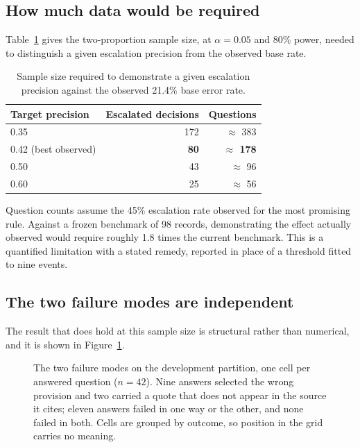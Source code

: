 \subsection{How much data would be required}

Table~\ref{tab:power} gives the two-proportion sample size, at
$\alpha = 0.05$ and 80\% power, needed to distinguish a given escalation
precision from the observed base rate.

\begin{table}[htbp]
  \centering
  \caption{Sample size required to demonstrate a given escalation precision against the observed 21.4\% base error rate.}
  \label{tab:power}
  \begin{tabular}{lrr}
    \toprule
    \textbf{Target precision} & \textbf{Escalated decisions} & \textbf{Questions} \\
    \midrule
    0.35 & 172 & $\approx$ 383 \\
    0.42 (best observed) & \textbf{80} & \textbf{$\approx$ 178} \\
    0.50 & 43 & $\approx$ 96 \\
    0.60 & 25 & $\approx$ 56 \\
    \bottomrule
  \end{tabular}
\end{table}

Question counts assume the 45\% escalation rate observed for the most promising
rule. Against a frozen benchmark of 98 records, demonstrating the effect actually
observed would require roughly 1.8 times the current benchmark. This is a quantified limitation with a stated remedy, reported in place of a
threshold fitted to nine events.

\subsection{The two failure modes are independent}

The result that does hold at this sample size is structural rather than
numerical, and it is shown in Figure~\ref{fig:failure-modes}.

\begin{figure}[htbp]
  \centering
  
  \caption[The two failure modes do not co-occur]{The two failure modes on the
  development partition, one cell per answered question ($n = 42$). Nine answers
  selected the wrong provision and two carried a quote that does not appear in
  the source it cites; eleven answers failed in one way or the other, and none
  failed in both. Cells are grouped by outcome, so position in the grid carries
  no meaning.}
  \label{fig:failure-modes}
\end{figure}

